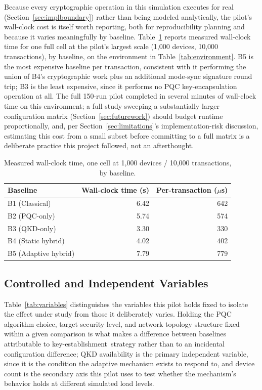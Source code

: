 \documentclass[journal]{IEEEtran}
\newcommand{\keyest}{key-establishment}
\begin{document}
Because every cryptographic operation in this simulation executes for real (Section~\ref{sec:implboundary}) rather than being modeled analytically, the pilot's wall-clock cost is itself worth reporting, both for reproducibility planning and because it varies meaningfully by baseline. Table~\ref{tab:runtime} reports measured wall-clock time for one full cell at the pilot's largest scale (1{,}000 devices, 10{,}000 transactions), by baseline, on the environment in Table~\ref{tab:environment}. B5 is the most expensive baseline per transaction, consistent with it performing the union of B4's cryptographic work plus an additional mode-sync signature round trip; B3 is the least expensive, since it performs no PQC key-encapsulation operation at all. The full 150-run pilot completed in several minutes of wall-clock time on this environment; a full study sweeping a substantially larger configuration matrix (Section~\ref{sec:futurework}) should budget runtime proportionally, and, per Section~\ref{sec:limitations}'s implementation-risk discussion, estimating this cost from a small subset before committing to a full matrix is a deliberate practice this project followed, not an afterthought.

\begin{table}[t]
\centering
\caption{Measured wall-clock time, one cell at 1{,}000 devices / 10{,}000 transactions, by baseline.}
\label{tab:runtime}
\small
\begin{tabular}{@{}lrr@{}}
\toprule
Baseline & Wall-clock time (s) & Per-transaction ($\mu$s) \\
\midrule
B1 (Classical) & 6.42 & 642 \\
B2 (PQC-only) & 5.74 & 574 \\
B3 (QKD-only) & 3.30 & 330 \\
B4 (Static hybrid) & 4.02 & 402 \\
B5 (Adaptive hybrid) & 7.79 & 779 \\
\bottomrule
\end{tabular}
\end{table}

\subsection{Controlled and Independent Variables}

Table~\ref{tab:variables} distinguishes the variables this pilot holds fixed to isolate the effect under study from those it deliberately varies. Holding the PQC algorithm choice, target security level, and network topology structure fixed within a given comparison is what makes a difference between baselines attributable to \keyest\ strategy rather than to an incidental configuration difference; QKD availability is the primary independent variable, since it is the condition the adaptive mechanism exists to respond to, and device count is the secondary axis this pilot uses to test whether the mechanism's behavior holds at different simulated load levels.
\end{document}
